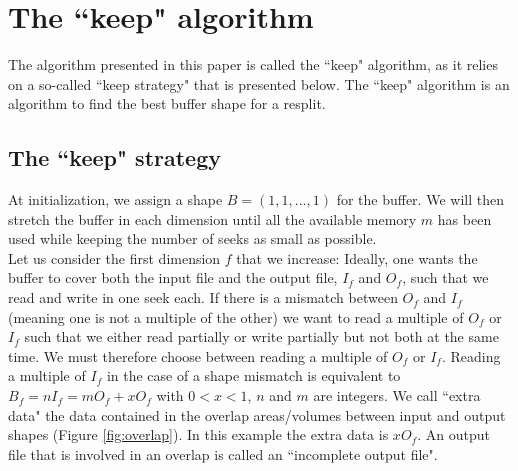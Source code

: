 \documentclass[conference]{IEEEtran}
\begin{document}
\section*{The ``keep" algorithm}
The algorithm presented in this paper is called the ``keep" algorithm, as it relies on a so-called ``keep strategy" that is presented below.
The ``keep" algorithm is an algorithm to find the best buffer shape for a resplit.

\subsection{The ``keep" strategy}
At initialization, we assign a shape $B = (1, 1,..., 1)$ for the buffer.
We will then stretch the buffer in each dimension until all the available memory $m$ has been used while keeping the number of seeks as small as possible. \\

Let us consider the first dimension $f$ that we increase: Ideally, one wants the buffer to cover both the input file and the output file, $I_f$ and $O_f$, such that we read and write in one seek each.
If there is a mismatch between $O_f$ and $I_f$ (meaning one is not a multiple of the other) we want to read a multiple of $O_f$ or $I_f$ such that we either read partially or write partially but not both at the same time.
We must therefore choose between reading a multiple of $O_f$ or $I_f$.
Reading a multiple of $I_f$ in the case of a shape mismatch is equivalent to $B_f = nI_f = mO_f+xO_f$ with $0<x<1$, $n$ and $m$ are integers.
We call ``extra data" the data contained in the overlap areas/volumes between input and output shapes (Figure \ref{fig:overlap}).
In this example the extra data is $xO_f$.
An output file that is involved in an overlap is called an ``incomplete output file". \\
\end{document}

